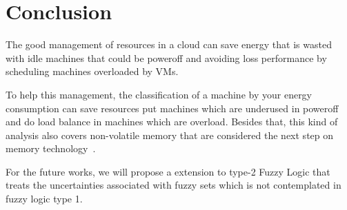 \documentclass[runningheads,a4paper]{llncs}
\begin{document}



\section{Conclusion}\label{sec:conclusion}
The good management of resources in a cloud can save energy that is wasted with idle machines that could be poweroff and avoiding loss performance by scheduling machines overloaded by VMs.

To help this management, the classification of a machine by your energy consumption can save resources put machines which are underused in poweroff and do load balance in machines which are overload. Besides that, this kind of analysis also covers non-volatile memory that are considered the next step on memory technology~\cite{mittal2015survey}.

For the future works, we will propose a extension to type-2 Fuzzy Logic that treats the uncertainties associated with fuzzy sets which is not contemplated in fuzzy logic type 1.







%
%

 

\end{document}
